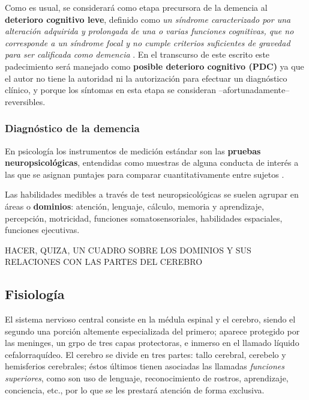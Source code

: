 Como es usual, se considerará como etapa precursora de la demencia al
\textbf{deterioro cognitivo leve}, definido como \textit{un
síndrome caracterizado por una alteración adquirida y prolongada de una o varias funciones 
cognitivas, que no corresponde a un síndrome focal y no cumple criterios suficientes de 
gravedad para ser calificada como demencia} \cite{Robles02}.
En el transcurso de este escrito este padecimiento
será manejado como \textbf{posible deterioro cognitivo (PDC)} ya
que el autor no tiene la autoridad ni la autorización para efectuar un diagnóstico clínico, y 
porque los síntomas en esta etapa se consideran --afortunadamente-- reversibles.


\subsubsection{Diagnóstico de la demencia}

En psicología los instrumentos de medición estándar son las \textbf{pruebas neuropsicológicas}, 
entendidas como muestras
de alguna conducta de interés a las que se asignan puntajes para comparar cuantitativamente
entre sujetos \cite{Ardila12}.

Las habilidades medibles a través de test neuropsicológicas se suelen agrupar en áreas o
\textbf{dominios}: atención, lenguaje, cálculo, memoria y aprendizaje, percepción,
motricidad, funciones somatosensoriales, habilidades espaciales, funciones ejecutivas. 

HACER, QUIZA, UN CUADRO SOBRE LOS DOMINIOS Y SUS RELACIONES CON LAS PARTES DEL CEREBRO


\subsection{Fisiología}

El sistema nervioso central consiste en la médula espinal y el cerebro, siendo el segundo una
porción altemente especializada del primero; aparece protegido por las meninges, un grpo de tres capas 
protectoras, e inmerso en el llamado líquido cefalorraquídeo.
El cerebro se divide en tres partes: tallo cerebral, cerebelo y hemisferios cerebrales;
éstos últimos tienen asociadas las llamadas \textit{funciones superiores}, como son uso de lenguaje,
reconocimiento de rostros, aprendizaje, conciencia, etc., por lo que se les prestará
atención de forma exclusiva.

